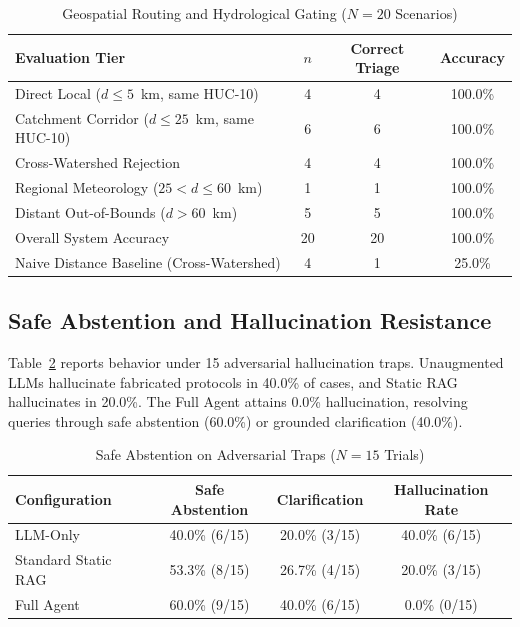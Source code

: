 \documentclass[conference]{IEEEtran}
\begin{document}
\begin{table}[!t]
\caption{Geospatial Routing and Hydrological Gating ($N=20$ Scenarios)}
\label{tab:geo}
\centering
\scriptsize
\setlength{\tabcolsep}{2.5pt}
\begin{tabular*}{\columnwidth}{@{\extracolsep{\fill}}lccc@{}}
\toprule
Evaluation Tier & $n$ & Correct Triage & Accuracy \\
\midrule
Direct Local ($d \le 5$~km, same HUC-10) & 4 & 4 & 100.0\% \\
Catchment Corridor ($d \le 25$~km, same HUC-10) & 6 & 6 & 100.0\% \\
Cross-Watershed Rejection & 4 & 4 & 100.0\% \\
Regional Meteorology ($25 < d \le 60$~km) & 1 & 1 & 100.0\% \\
Distant Out-of-Bounds ($d > 60$~km) & 5 & 5 & 100.0\% \\
\midrule
Overall System Accuracy & 20 & 20 & 100.0\% \\
Naive Distance Baseline (Cross-Watershed) & 4 & 1 & 25.0\% \\
\bottomrule
\end{tabular*}
\end{table}

\subsection{Safe Abstention and Hallucination Resistance}
Table~\ref{tab:abstention} reports behavior under 15 adversarial hallucination traps. Unaugmented LLMs hallucinate fabricated protocols in 40.0\% of cases, and Static RAG hallucinates in 20.0\%. The Full Agent attains 0.0\% hallucination, resolving queries through safe abstention (60.0\%) or grounded clarification (40.0\%).

\begin{table}[!t]
\caption{Safe Abstention on Adversarial Traps ($N=15$ Trials)}
\label{tab:abstention}
\centering
\footnotesize
\setlength{\tabcolsep}{3pt}
\begin{tabular*}{\columnwidth}{@{\extracolsep{\fill}}lccc@{}}
\toprule
Configuration & Safe Abstention & Clarification & Hallucination Rate \\
\midrule
LLM-Only & 40.0\% (6/15) & 20.0\% (3/15) & 40.0\% (6/15) \\
Standard Static RAG & 53.3\% (8/15) & 26.7\% (4/15) & 20.0\% (3/15) \\
Full Agent & 60.0\% (9/15) & 40.0\% (6/15) & 0.0\% (0/15) \\
\bottomrule
\end{tabular*}
\end{table}
\end{document}

